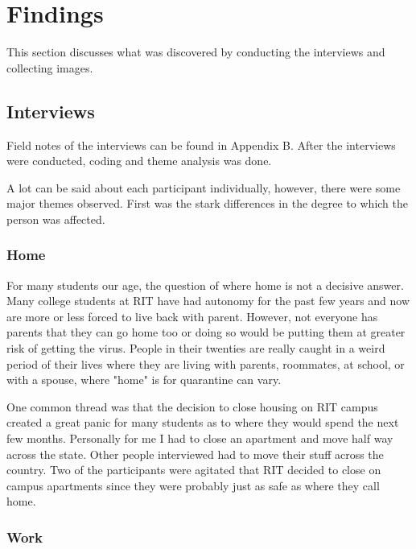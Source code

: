 \documentclass[12pt,
 reprint,
nofootinbib,
 amsmath,amssymb,
 aps,
]{revtex4-2}
\begin{document}
\section{Findings}

This section discusses what was discovered by conducting the interviews and collecting images.

\subsection{Interviews}

Field notes of the interviews can be found in Appendix B. After the interviews were conducted, coding and theme analysis was done. 

A lot can be said about each participant individually, however, there were some major themes observed. First was the stark differences in the degree to which the person was affected. 




\subsubsection{Home}

For many students our age, the question of where home is not a decisive answer.
Many college students at RIT have had autonomy for the past few years and now are more or less forced to live back with parent. However, not everyone has parents that they can go home too or doing so would be putting them at greater risk of getting the virus. People in their twenties are really caught in a weird period of their lives where they are living with parents, roommates, at school, or with a spouse, where "home" is for quarantine can vary.

One common thread was that the decision to close housing on RIT campus created a great panic for many students as to where they would spend the next few months. Personally for me I had to close an apartment and move half way across the state. Other people interviewed had to move their stuff across the country.
Two of the participants were agitated that RIT decided to close on campus apartments since they were probably just as safe as where they call home. 


\subsubsection{Work}

\end{document}
